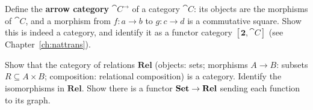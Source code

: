 \begin{exercise}[$\star$]
Define the \textbf{arrow category} $\cat{C}^{\to}$ of a category $\cat{C}$: its objects are the morphisms of $\cat{C}$, and a morphism from $f: a \to b$ to $g: c \to d$ is a commutative square. Show this is indeed a category, and identify it as a functor category $[\mathbf{2}, \cat{C}]$ (see Chapter~\ref{ch:nattrans}).
\end{exercise}

\begin{exercise}[$\star\star$]
Show that the category of relations $\mathbf{Rel}$ (objects: sets; morphisms $A \to B$: subsets $R \subseteq A \times B$; composition: relational composition) is a category. Identify the isomorphisms in $\mathbf{Rel}$. Show there is a functor $\mathbf{Set} \to \mathbf{Rel}$ sending each function to its graph.
\end{exercise}
